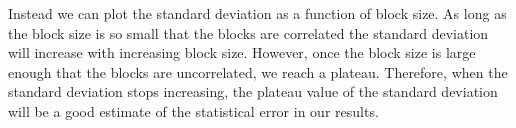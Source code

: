 \documentclass[../main.tex]{subfiles}
\begin{document}
Instead we can plot the standard deviation as a function of block size. As long as the block size is so small that the blocks are correlated the standard deviation will increase with increasing block size. However, once the block size is large enough that the blocks are uncorrelated, we reach a plateau. Therefore, when the standard deviation stops increasing, the plateau value of the standard deviation will be a good estimate of the statistical error in our results.

\end{document}
